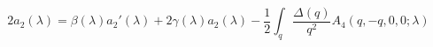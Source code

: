 \begin{equation}
2 a_2 (\lambda) = \beta (\lambda) a_2' (\lambda) + 2 \gamma (\lambda)
a_2 (\lambda) - \frac{1}{2} \int_q \frac{\Delta (q)}{q^2} A_4
(q,-q,0,0; \lambda) \label{mainatwo}
\end{equation}

